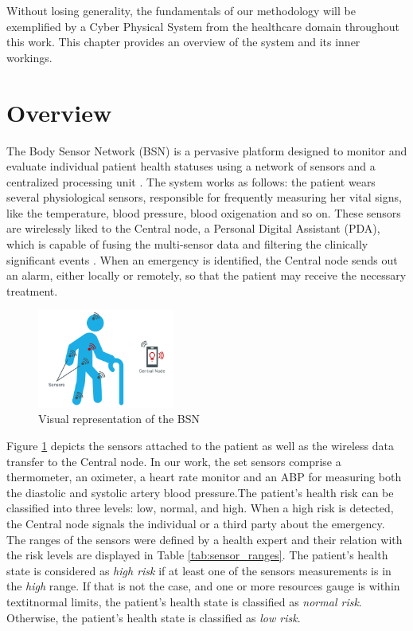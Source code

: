 \label{sec:BSN}
Without losing generality, the fundamentals of our methodology will be exemplified by a Cyber Physical System from the healthcare domain throughout this work. This chapter provides an overview of the system and its inner workings.

\section{Overview}

The Body Sensor Network (BSN) \cite{pessoa2017building} is a pervasive platform designed to monitor and evaluate individual patient health statuses using a network of sensors and a centralized processing unit \cite{2021BSN}. The system works as follows: the patient wears several physiological sensors, responsible for frequently measuring her vital signs, like the temperature, blood pressure, blood oxigenation and so on. These sensors are wirelessly liked to the Central node, a Personal Digital Assistant (PDA), which is capable of fusing the multi-sensor data and filtering the clinically significant  events \cite{lo2005body}. When an emergency is identified, the Central node sends out an alarm, either locally or remotely, so that the patient may receive the necessary treatment. 

\begin{figure}[!h]
	\centering
	\includegraphics[width=0.4\textwidth, keepaspectratio]{img/BSN-overview.png}
	\caption{Visual representation of the BSN}
	\label{fig:BSN-overview}
\end{figure}

Figure \ref{fig:BSN-overview} depicts the sensors attached to the patient as well as the wireless data transfer to the Central node. In our work, the set sensors comprise a thermometer, an oximeter, a heart rate monitor and an ABP for measuring both the diastolic and systolic artery blood pressure.The patient's health risk can be classified into three levels: low, normal, and high. When a high risk is detected, the Central node signals the individual or a third party about the emergency. The ranges of the sensors were defined by a health expert \cite{pessoa2017building} and their relation with the risk levels are displayed in Table \ref{tab:sensor_ranges}. The patient's health state is considered as \textit{high risk} if at least one of the sensors measurements is in the \textit{high} range. If that is not the case, and one or more resources gauge is within textit{normal} limits, the patient's health state is classified as \textit{normal risk}. Otherwise, the patient's health state is classified as \textit{low risk}.


